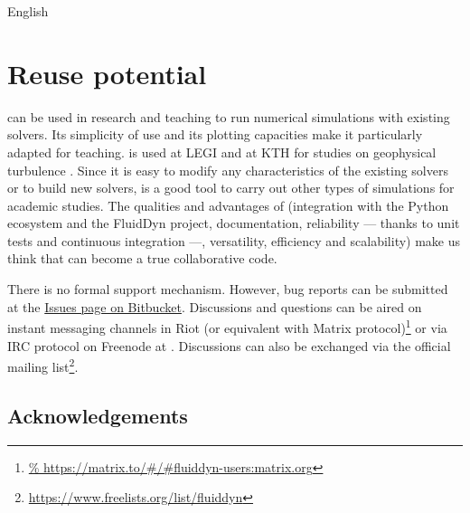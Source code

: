 English

\section{Reuse potential}


 can be used in research and teaching to run numerical simulations
with existing solvers.
%
Its simplicity of use and its plotting capacities make it particularly adapted for
teaching.
%
 is used at LEGI and at KTH for studies on geophysical turbulence
\cite[see for example][]{LindborgMohanan2017}.
%
Since it is easy to modify any characteristics of the existing solvers or to build
new solvers,  is a good tool to carry out other types of
simulations for academic studies.
%
The qualities and advantages of  (integration with the Python
ecosystem and the FluidDyn project, documentation, reliability --- thanks to unit tests
and continuous integration ---, versatility, efficiency and scalability) make us think
that  can become a true collaborative code.

There is no formal support mechanism. However, bug reports can be submitted at
the \href{https://bitbucket.org/fluiddyn/fluidsim/issues}{Issues page on
Bitbucket}. Discussions and questions can be aired on instant messaging
channels in Riot (or equivalent with Matrix protocol)\footnote{
\url{%
  https://matrix.to/\#/\#fluiddyn-users:matrix.org}}
or via IRC protocol on Freenode at . Discussions
can also be exchanged via the official mailing list\footnote{
\url{https://www.freelists.org/list/fluiddyn}}.

\subsection*{Acknowledgements}


